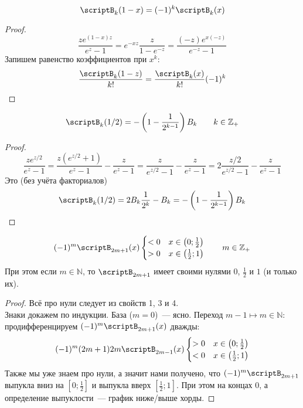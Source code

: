 \documentclass{article}
\begin{document}
    \begin{property}
        $$
        \scriptB_k(1-x)=(-1)^k\scriptB_k(x)
        $$
    \end{property}
    \begin{proof}
        $$
        \frac{ze^{(1-x)z}}{e^z-1}=e^{-xz}\frac z{1-e^{-z}}=\frac{(-z)e^{x(-z)}}{e^{-z}-1}
        $$
        Запишем равенство коэффициентов при $x^k$:
        $$
        \frac{\scriptB_k(1-z)}{k!}=\frac{\scriptB_k(x)}{k!}(-1)^k
        $$
    \end{proof}
    \begin{property}
        $$\scriptB_k(1/2)=-\left(1-\frac1{2^{k-1}}\right)B_k\qquad k\in\mathbb Z_+$$
    \end{property}
    \begin{proof}
        $$
        \frac{ze^{z/2}}{e^z-1}=\frac{z(e^{z/2}+1)}{e^z-1}-\frac z{e^z-1}=\frac{z}{e^{z/2}-1}-\frac z{e^z-1}=2\frac{z/2}{e^{z/2}-1}-\frac z{e^z-1}
        $$
        Это (без учёта факториалов)
        $$
        \scriptB_k(1/2)=2B_k\frac1{2^k}-B_k=-\left(1-\frac1{2^{k-1}}\right)B_k
        $$
    \end{proof}
    \begin{property}
        $$
        (-1)^m\scriptB_{2m+1}(x)\begin{cases}
            <0&x\in\left(0;\frac12\right)\\
            >0&x\in\left(\frac12;1\right)
        \end{cases}
        \qquad m\in\mathbb Z_+$$
        При этом если $m\in\mathbb N$, то $\scriptB_{2m+1}$ имеет своими нулями $0$, $\frac12$ и $1$ (и только их).
    \end{property}
    \begin{proof}
        Всё про нули следует из свойств 1, 3 и 4.\\
        Знаки докажем по индукции. База ($m=0$)~--- ясно. Переход $m-1\mapsto m\in\mathbb N$: продифференцируем $(-1)^m\scriptB_{2m+1}(x)$ дважды:
        $$
        (-1)^m(2m+1)2m\scriptB_{2m-1}(x)\begin{cases}
            >0&x\in\left(0;\frac12\right)\\
            <0&x\in\left(\frac12;1\right)
        \end{cases}
        $$
        Также мы уже знаем про нули, а значит нами получено, что $(-1)^m\scriptB_{2m+1}$ выпукла вниз на $\left[0;\frac12\right]$ и выпукла вверх $\left[\frac12;1\right]$. При этом на концах $0$, а определение выпуклости~--- график ниже/выше хорды.
    \end{proof}
\end{document}
